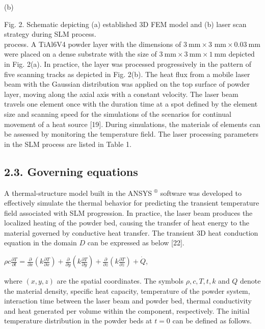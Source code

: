 \documentclass[10pt]{article}
\begin{document}
(b)

Fig. 2. Schematic depicting (a) established 3D FEM model and (b) laser scan strategy during SLM process.\\
process. A TiAl6V4 powder layer with the dimensions of $3 \mathrm{~mm} \times 3$ $\mathrm{mm} \times 0.03 \mathrm{~mm}$ were placed on a dense substrate with the size of $3 \mathrm{~mm} \times 3 \mathrm{~mm} \times 1 \mathrm{~mm}$ depicted in Fig. 2(a). In practice, the layer was processed progressively in the pattern of five scanning tracks as depicted in Fig. 2(b). The heat flux from a mobile laser beam with the Gaussian distribution was applied on the top surface of powder layer, moving along the axial axis with a constant velocity. The laser beam travels one element once with the duration time at a spot defined by the element size and scanning speed for the simulations of the scenarios for continual movement of a heat source [19]. During simulations, the materials of elements can be assessed by monitoring the temperature field. The laser processing parameters in the SLM process are listed in Table 1.

\subsection*{2.3. Governing equations}
A thermal-structure model built in the ANSYS ${ }^{\circledR}$ software was developed to effectively simulate the thermal behavior for predicting the transient temperature field associated with SLM progression. In practice, the laser beam produces the localized heating of the powder bed, causing the transfer of heat energy to the material governed by conductive heat transfer. The transient 3D heat conduction equation in the domain $D$ can be expressed as below [22].

$\rho c \frac{\partial T}{\partial t}=\frac{\partial}{\partial x}\left(k \frac{\partial T}{\partial x}\right)+\frac{\partial}{\partial y}\left(k \frac{\partial T}{\partial y}\right)+\frac{\partial}{\partial z}\left(k \frac{\partial T}{\partial z}\right)+\dot{Q}$,

where $(x, y, z)$ are the spatial coordinates. The symbols $\rho, c, T, t, k$ and $Q$ denote the material density, specific heat capacity, temperature of the powder system, interaction time between the laser beam and powder bed, thermal conductivity and heat generated per volume within the component, respectively. The initial temperature distribution in the powder beds at $t=0$ can be defined as follows.
\end{document}
